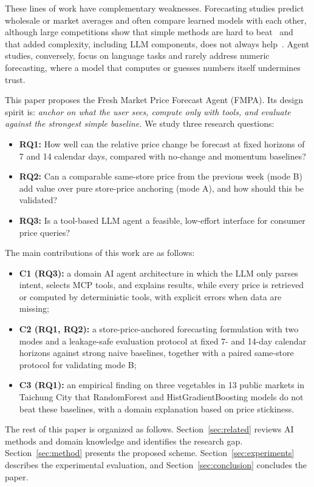 These lines of work have complementary weaknesses. Forecasting studies predict
wholesale or market averages and often compare learned models with each other,
although large competitions show that simple methods are hard to
beat~\cite{makridakis2020m4} and that added complexity, including LLM
components, does not always help~\cite{zeng2023transformers,tan2024language}.
Agent studies, conversely, focus on language tasks and rarely address numeric
forecasting, where a model that computes or guesses numbers itself undermines
trust.

This paper proposes the Fresh Market Price Forecast Agent (FMPA). Its design
spirit is: \emph{anchor on what the user sees, compute only with tools, and
evaluate against the strongest simple baseline.} We study three research
questions:
\begin{itemize}
\item \textbf{RQ1:} How well can the relative price change be forecast at
fixed horizons of 7 and 14 calendar days, compared with no-change and momentum
baselines?
\item \textbf{RQ2:} Can a comparable same-store price from the previous week
(mode B) add value over pure store-price anchoring (mode A), and how should
this be validated?
\item \textbf{RQ3:} Is a tool-based LLM agent a feasible, low-effort interface
for consumer price queries?
\end{itemize}
The main contributions of this work are as follows:
\begin{itemize}
\item \textbf{C1 (RQ3):} a domain AI agent architecture in which the LLM only
parses intent, selects MCP tools, and explains results, while every price is
retrieved or computed by deterministic tools, with explicit errors when data
are missing;
\item \textbf{C2 (RQ1, RQ2):} a store-price-anchored forecasting formulation
with two modes and a leakage-safe evaluation protocol at fixed 7- and 14-day
calendar horizons against strong naive baselines, together with a paired
same-store protocol for validating mode B;
\item \textbf{C3 (RQ1):} an empirical finding on three vegetables in 13 public
markets in Taichung City that RandomForest and HistGradientBoosting models do
not beat these baselines, with a domain explanation based on price stickiness.
\end{itemize}

The rest of this paper is organized as follows. Section~\ref{sec:related}
reviews AI methods and domain knowledge and identifies the research gap.
Section~\ref{sec:method} presents the proposed scheme.
Section~\ref{sec:experiments} describes the experimental evaluation, and
Section~\ref{sec:conclusion} concludes the paper.
